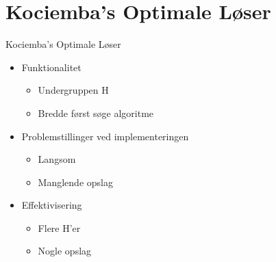 \section{Kociemba's Optimale L\o{}ser}
\begin{frame}{Kociemba's Optimale L\o{}ser}
\begin{itemize}
	\item Funktionalitet
	\begin{itemize}
		\item Undergruppen H
		\item Bredde f\o{}rst s\o{}ge algoritme
	\end{itemize}
	\item Problemstillinger ved implementeringen
	\begin{itemize}
		\item Langsom
		\item Manglende opslag
	\end{itemize}
	\item Effektivisering
	\begin{itemize}
		\item Flere H'er
		\item Nogle opslag
	\end{itemize}
\end{itemize}
\end{frame}